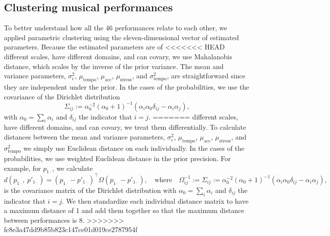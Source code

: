 \documentclass[aoas]{imsart}
\begin{document}
\subsection{Clustering musical performances}
\label{sec:clust-music-perf}

To better understand how all the 46 performances relate to each other,
we applied parametric clustering using the eleven-dimensional vector
of estimated parameters. Because the estimated parameters are of
<<<<<<< HEAD
different scales, have different domains, and can covary, we
use
Mahalanobis distance, which scales by the inverse of the prior variance. The mean and
variance parameters, $\sigma^2_\epsilon$, $\mu_{\textrm{tempo}}$,
$\mu_{\textrm{acc}}$, $\mu_{\textrm{stress}}$, and
$\sigma^2_{\textrm{tempo}}$, are straightforward since they are
independent under the prior. In the cases of the probabilities, we use
the covariance of the Dirichlet distribution
\begin{equation}
\Sigma_{ij} :=
  \alpha_0^{-2}(\alpha_0+1)^{-1}\left(\alpha_i\alpha_0 \delta_{ij}
    - \alpha_i\alpha_j\right),
\end{equation}
with
$\alpha_0=\sum_i\alpha_i$ and $\delta_{ij}$ the indicator that
$i=j$.
=======
different scales, have different domains, and can covary, we treat
them differentially. To calculate distances between the mean and
variance parameters, $\sigma^2_\epsilon$, $\mu_{\textrm{tempo}}$,
$\mu_{\textrm{acc}}$, $\mu_{\textrm{stress}}$, and
$\sigma^2_{\textrm{tempo}}$ we simply use Euclidean distance on each
individually. In the cases of the probabilities, we use weighted
Euclidean distance in the prior precision. For example, for
$p_{1\cdot}$, we calculate
\begin{equation}
d\left(p_{1\cdot},\ p'_{1\cdot}\right) = (p_{1\cdot}-p'_{1\cdot})^\top
  \Omega (p_{1\cdot}-p'_{1\cdot}),\quad
\textrm{where}
  \quad\Omega^{-1}_{ij} := \Sigma_{ij} :=
  \alpha_0^{-2}(\alpha_0+1)^{-1}\left(\alpha_i\alpha_0 \delta_{ij}
    - \alpha_i\alpha_j\right),
\end{equation}
is the covariance matrix of the Dirichlet distribution with
$\alpha_0=\sum_i\alpha_i$ and $\delta_{ij}$ the indicator that
$i=j$. We then standardize each individual distance matrix to have a
maximum distance of 1 and add them together so that the maximum distance
between performances is 8.
>>>>>>> fc8e3a47dd9b85b823c147ce01d019ce2787954f
\end{document}
